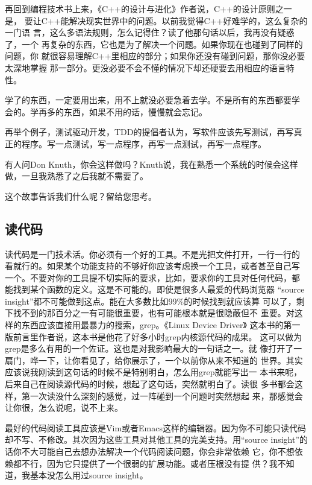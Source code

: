 \documentclass[10pt]{article}
\begin{document}
\begin{CJK*}{UTF8}{simhei}
再回到编程技术书上来，《C++的设计与进化》作者说，C++的设计原则之一是，
要让C++能解决现实世界中的问题。以前我觉得C++好难学的，这么复杂的一门语
言，这么多语法规则，怎么记得住？读了他那句话以后，我再没有疑惑了，一个
再复杂的东西，它也是为了解决一个问题。如果你现在也碰到了同样的问题，你
就很容易理解C++里相应的部分；如果你还没有碰到问题，那你没必要太深地掌握
那一部分。更没必要不会不懂的情况下却还硬要去用相应的语言特性。

学了的东西，一定要用出来，用不上就没必要急着去学。不是所有的东西都要学
会的。学再多的东西，如果不用的话，慢慢就会忘记。

再举个例子，测试驱动开发，TDD的提倡者认为，写软件应该先写测试，再写真
正的程序。写一点测试，写一点程序，再写一点测试，再写一点程序。

有人问Don Knuth，你会这样做吗？Knuth说，我在熟悉一个系统的时候会这样
做，一旦我熟悉了之后我就不需要了。

这个故事告诉我们什么呢？留给您思考。

\subsection{读代码}

读代码是一门技术活。你必须有一个好的工具。不是光把文件打开，一行一行的
看就行的。如果某个功能支持的不够好你应该考虑换一个工具，或者甚至自己写
一个。不要对你的工具提不切实际的要求，比如，要求你的工具对任何代码，都
能找到某个函数的定义。这是不可能的。即使是很多人最爱的代码浏览器
“source insight”都不可能做到这点。能在大多数比如99\%的时候找到就应该算
可以了，剩下找不到的那百分之一有可能很重要，也有可能根本就是很隐蔽但不
重要。对这样的东西应该直接用最暴力的搜索，grep。《Linux Device Driver》
这本书的第一版前言里作者说，这本书是他花了好多小时grep内核源代码的成果。
这可以做为grep是多么有用的一个佐证。这也是对我影响最大的一句话之一。就
像打开了一扇门，哗一下，让你看见了，给你展示了，一个以前你从来不知道的
世界。其实应该说我刚读到这句话的时候不是特别明白，怎么用grep就能写出一
本书来呢，后来自己在阅读源代码的时候，想起了这句话，突然就明白了。读很
多书都会这样，第一次读没什么深刻的感觉，过一阵碰到一个问题时突然想起
来，那感觉会让你很，怎么说呢，说不上来。

最好的代码阅读工具应该是Vim或者Emacs这样的编辑器。因为你不可能只读代码
却不写、不修改。其次因为这些工具对其他工具的完美支持。用“source
insight”的话你不大可能自己去想办法解决一个代码阅读问题，你会非常依赖
它，你不想依赖都不行，因为它只提供了一个很弱的扩展功能。或者压根没有提
供？我不知道，我基本没怎么用过source insight。


\end{CJK*}
\end{document}
